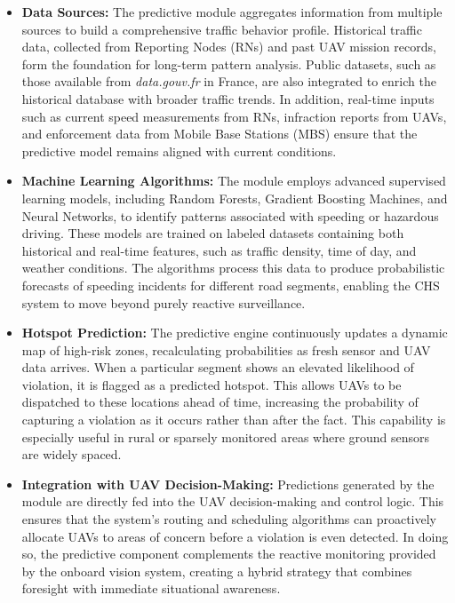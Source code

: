 \begin{itemize}
    \item \textbf{Data Sources:}  
    The predictive module aggregates information from multiple sources to build a comprehensive traffic behavior profile. Historical traffic data, collected from Reporting Nodes (RNs) and past UAV mission records, form the foundation for long-term pattern analysis. Public datasets, such as those available from \textit{data.gouv.fr} in France, are also integrated to enrich the historical database with broader traffic trends. In addition, real-time inputs such as current speed measurements from RNs, infraction reports from UAVs, and enforcement data from Mobile Base Stations (MBS) ensure that the predictive model remains aligned with current conditions.

    \item \textbf{Machine Learning Algorithms:}  
    The module employs advanced supervised learning models, including Random Forests, Gradient Boosting Machines, and Neural Networks, to identify patterns associated with speeding or hazardous driving. These models are trained on labeled datasets containing both historical and real-time features, such as traffic density, time of day, and weather conditions. The algorithms process this data to produce probabilistic forecasts of speeding incidents for different road segments, enabling the CHS system to move beyond purely reactive surveillance.

    \item \textbf{Hotspot Prediction:}  
    The predictive engine continuously updates a dynamic map of high-risk zones, recalculating probabilities as fresh sensor and UAV data arrives. When a particular segment shows an elevated likelihood of violation, it is flagged as a predicted hotspot. This allows UAVs to be dispatched to these locations ahead of time, increasing the probability of capturing a violation as it occurs rather than after the fact. This capability is especially useful in rural or sparsely monitored areas where ground sensors are widely spaced.

    \item \textbf{Integration with UAV Decision-Making:}  
    Predictions generated by the module are directly fed into the UAV decision-making and control logic. This ensures that the system’s routing and scheduling algorithms can proactively allocate UAVs to areas of concern before a violation is even detected. In doing so, the predictive component complements the reactive monitoring provided by the onboard vision system, creating a hybrid strategy that combines foresight with immediate situational awareness.


\end{itemize}
